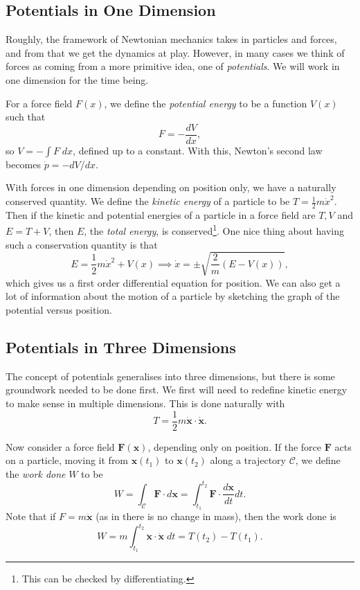 \documentclass{scrartcl}
\newcommand{\vv}[1]{\boldsymbol{\mathbf{#1}}}
\theoremstyle{definition}
\begin{document}
\subsection*{Potentials in One Dimension}

Roughly, the framework of Newtonian mechanics takes in particles and forces, and from that we get the dynamics at play. However, in many cases we think of forces as coming from a more primitive idea, one of \emph{potentials}. We will work in one dimension for the time being.

For a force field $F(x)$, we define the \emph{potential energy} to be a function $V(x)$ such that
$$
F = - \frac{dV}{dx},
$$
so $V = -\int F \; dx$, defined up to a constant. With this, Newton's second law becomes $\dot{p} = -dV/dx$.

With forces in one dimension depending on position only, we have a naturally conserved quantity. We define the \emph{kinetic energy} of a particle to be $T = \frac{1}{2}m \dot{x}^2$. Then if the kinetic and potential energies of a particle in a force field are $T, V$ and $E = T + V$, then $E$, the \emph{total energy}, is conserved\footnote{This can be checked by differentiating.}. One nice thing about having such a conservation quantity is that
$$
E = \frac{1}{2}m \dot{x}^2 + V(x) \implies  \dot{x} = \pm \sqrt{\frac{2}{m} (E - V(x))},
$$
which gives us a first order differential equation for position. We can also get a lot of information about the motion of a particle by sketching the graph of the potential versus position.

\subsection*{Potentials in Three Dimensions}

The concept of potentials generalises into three dimensions, but there is some groundwork needed to be done first. We first will need to redefine kinetic energy to make sense in multiple dimensions. This is done naturally with 
$$
T = \frac{1}{2} m \dot{\vv x} \cdot \dot{\vv x}.
$$

Now consider a force field $\vv F(\vv x)$, depending only on position.  If the force $\vv F$ acts on a particle, moving it from $\vv x(t_1)$ to $\vv x(t_2)$ along a trajectory $\mathcal{C}$, we define the \emph{work done} $W$ to be
$$
W = \int_\mathcal{C} \vv F \cdot d \vv x = \int_{t_1}^{t_2} \vv F \cdot \frac{d \vv x}{d t} d t.
$$
Note that if $F = m \ddot{\vv x}$ (as in there is no change in mass), then the work done is
$$
W = m \int_{t_1}^{t_2} \ddot{\vv x} \cdot \dot{\vv x} \; dt = T(t_2) - T(t_1).
$$
\end{document}
